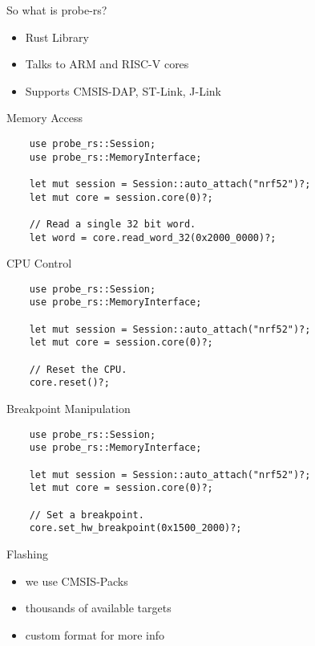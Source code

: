 \documentclass[aspectratio=1610,14pt,t]{beamer}
\begin{document}
\begin{frame}[c]{So what is probe-rs?}
  \begin{itemize}
    \item Rust Library
    \item Talks to ARM and RISC-V cores
    \item Supports CMSIS-DAP, ST-Link, J-Link
  \end{itemize}
\end{frame}

\begin{frame}[c,fragile]{Memory Access}
  \begin{verbatim}
    use probe_rs::Session;
    use probe_rs::MemoryInterface;

    let mut session = Session::auto_attach("nrf52")?;
    let mut core = session.core(0)?;

    // Read a single 32 bit word.
    let word = core.read_word_32(0x2000_0000)?;
  \end{verbatim}
\end{frame}

\begin{frame}[c,fragile]{CPU Control}
  \begin{verbatim}
    use probe_rs::Session;
    use probe_rs::MemoryInterface;

    let mut session = Session::auto_attach("nrf52")?;
    let mut core = session.core(0)?;

    // Reset the CPU.
    core.reset()?;
  \end{verbatim}
\end{frame}

\begin{frame}[c,fragile]{Breakpoint Manipulation}
  \begin{verbatim}
    use probe_rs::Session;
    use probe_rs::MemoryInterface;

    let mut session = Session::auto_attach("nrf52")?;
    let mut core = session.core(0)?;

    // Set a breakpoint.
    core.set_hw_breakpoint(0x1500_2000)?;
  \end{verbatim}
\end{frame}

\begin{frame}[c,fragile]{Flashing}
  \begin{itemize}
    \item we use CMSIS-Packs
    \item thousands of available targets
    \item custom format for more info
  \end{itemize}
\end{frame}
\end{document}
